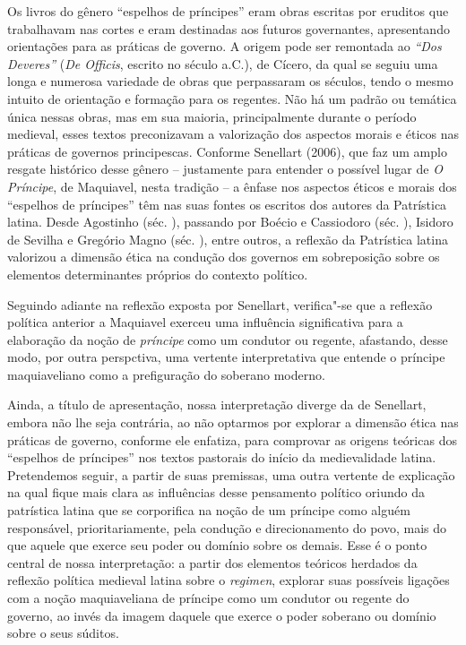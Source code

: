 Os livros do gênero ``espelhos de príncipes'' eram obras escritas por
eruditos que trabalhavam nas cortes e eram destinadas aos futuros
governantes, apresentando orientações para as práticas de governo. A
origem pode ser remontada ao \emph{``Dos Deveres''} (\emph{De Officis},
escrito no século  a.C.), de Cícero, da qual se seguiu uma longa e
numerosa variedade de obras que perpassaram os séculos, tendo o mesmo
intuito de orientação e formação para os regentes. Não há um padrão ou
temática única nessas obras, mas em sua maioria, principalmente durante
o período medieval, esses textos preconizavam a valorização dos aspectos
morais e éticos nas práticas de governos principescas. Conforme
Senellart (2006), que faz um amplo resgate histórico desse gênero --
justamente para entender o possível lugar de \emph{O Príncipe}, de
Maquiavel, nesta tradição -- a ênfase nos aspectos éticos e morais dos
``espelhos de príncipes'' têm nas suas fontes os escritos dos autores da
Patrística latina. Desde Agostinho (séc. ), passando por Boécio e
Cassiodoro (séc. ), Isidoro de Sevilha e Gregório Magno (séc. ),
entre outros, a reflexão da Patrística latina valorizou a dimensão ética
na condução dos governos em sobreposição sobre os elementos
determinantes próprios do contexto político.

Seguindo adiante na reflexão exposta por Senellart, verifica"-se que a
reflexão política anterior a Maquiavel exerceu uma influência
significativa para a elaboração da noção de \emph{príncipe} como um
condutor ou regente, afastando, desse modo, por outra perspctiva, uma
vertente interpretativa que entende o príncipe maquiaveliano como a
prefiguração do soberano moderno.

Ainda, a título de apresentação, nossa interpretação diverge da de
Senellart, embora não lhe seja contrária, ao não optarmos por explorar a
dimensão ética nas práticas de governo, conforme ele enfatiza, para
comprovar as origens teóricas dos ``espelhos de príncipes'' nos textos
pastorais do início da medievalidade latina. Pretendemos seguir, a
partir de suas premissas, uma outra vertente de explicação na qual fique
mais clara as influências desse pensamento político oriundo da
patrística latina que se corporifica na noção de um príncipe como alguém
responsável, prioritariamente, pela condução e direcionamento do povo,
mais do que aquele que exerce seu poder ou domínio sobre os demais. Esse
é o ponto central de nossa interpretação: a partir dos elementos
teóricos herdados da reflexão política medieval latina sobre o
\emph{regimen}, explorar suas possíveis ligações com a noção
maquiaveliana de príncipe como um condutor ou regente do governo, ao
invés da imagem daquele que exerce o poder soberano ou domínio sobre o
seus súditos.

